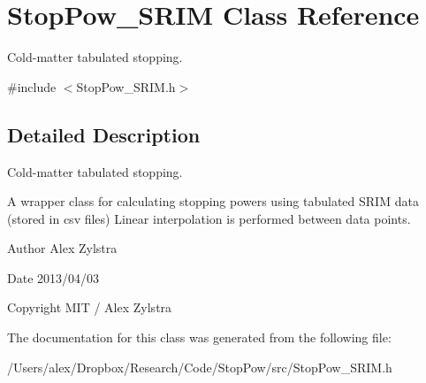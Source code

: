 \hypertarget{class_stop_pow___s_r_i_m}{\section{Stop\-Pow\-\_\-\-S\-R\-I\-M Class Reference}
\label{class_stop_pow___s_r_i_m}
}


Cold-\/matter tabulated stopping.  




{\ttfamily \#include $<$Stop\-Pow\-\_\-\-S\-R\-I\-M.\-h$>$}



\subsection{Detailed Description}
Cold-\/matter tabulated stopping. 

A wrapper class for calculating stopping powers using tabulated S\-R\-I\-M data (stored in csv files) Linear interpolation is performed between data points.

\begin{DoxyAuthor}{Author}
Alex Zylstra 
\end{DoxyAuthor}
\begin{DoxyDate}{Date}
2013/04/03 
\end{DoxyDate}
\begin{DoxyCopyright}{Copyright}
M\-I\-T / Alex Zylstra 
\end{DoxyCopyright}


The documentation for this class was generated from the following file\-:\begin{DoxyCompactItemize}
\item 
/\-Users/alex/\-Dropbox/\-Research/\-Code/\-Stop\-Pow/src/Stop\-Pow\-\_\-\-S\-R\-I\-M.\-h\end{DoxyCompactItemize}
